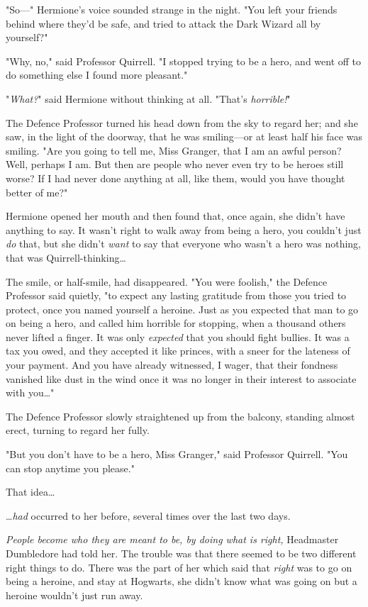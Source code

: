 "So---" Hermione's voice sounded strange in the night. "You left your friends
behind where they'd be safe, and tried to attack the Dark Wizard all by
yourself?"

"Why, no," said Professor Quirrell. "I stopped trying to be a hero, and went
off to do something else I found more pleasant."

"\emph{What?}" said Hermione without thinking at all. "That's \emph{horrible!}"

The Defence Professor turned his head down from the sky to regard her; and she
saw, in the light of the doorway, that he was smiling---or at least half his
face was smiling. "Are you going to tell me, Miss Granger, that I am an awful
person? Well, perhaps I am. But then are people who never even try to be heroes
still worse? If I had never done anything at all, like them, would you have
thought better of me?"

Hermione opened her mouth and then found that, once again, she didn't have
anything to say. It wasn't right to walk away from being a hero, you couldn't
just \emph{do} that, but she didn't \emph{want} to say that everyone who wasn't
a hero was nothing, that was Quirrell-thinking{\ldots}

The smile, or half-smile, had disappeared. "You were foolish," the Defence
Professor said quietly, "to expect any lasting gratitude from those you tried
to protect, once you named yourself a heroine. Just as you expected that man to
go on being a hero, and called him horrible for stopping, when a thousand
others never lifted a finger. It was only \emph{expected} that you should fight
bullies. It was a tax you owed, and they accepted it like princes, with a sneer
for the lateness of your payment. And you have already witnessed, I wager, that
their fondness vanished like dust in the wind once it was no longer in their
interest to associate with you{\ldots}"

The Defence Professor slowly straightened up from the balcony, standing almost
erect, turning to regard her fully.

"But you don't have to be a hero, Miss Granger," said Professor Quirrell. "You
can stop anytime you please."

That idea{\ldots}

{\ldots}\emph{had} occurred to her before, several times over the last two days.

\emph{People become who they are meant to be, by doing what is right,}
Headmaster Dumbledore had told her. The trouble was that there seemed to be two
different right things to do. There was the part of her which said that
\emph{right} was to go on being a heroine, and stay at Hogwarts, she didn't
know what was going on but a heroine wouldn't just run away.

